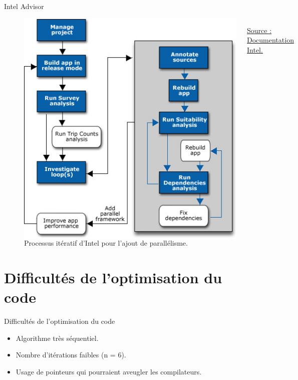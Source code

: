 \documentclass{beamer}
\begin{document}
\begin{frame}{Intel Advisor}
	\begin{figure}
	\begin{columns}
      \includegraphics[width=\textwidth]{Intel.jpg}
      \caption{Processus itératif d'Intel pour l'ajout de parallélisme.\label{Fig:intel_iter}}{\href{https://software.intel.com/en-us/articles/avoiding-and-identifying-false-sharing-among-threads}{Source : Documentation Intel.}}
    \end{columns}	
    \end{figure}
\end{frame}


\section{Difficultés de l'optimisation du code}

\begin{frame}{Difficultés de l'optimisation du code}
\begin{itemize}
\item
Algorithme très séquentiel.
\item
Nombre d'itérations faibles (n = 6).
\item
Usage de pointeurs qui pourraient aveugler les compilateurs.
\end{itemize}
\end{frame}
\end{document}
